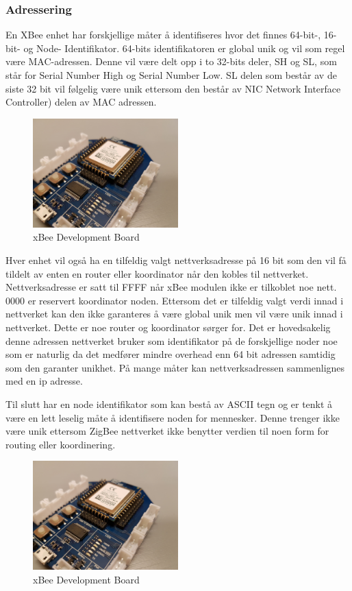 \documentclass{article}
\begin{document}
\subsubsection{Adressering}
En XBee enhet har forskjellige måter å identifiseres  hvor det finnes 64-bit-, 16-bit- og Node- Identifikator. 64-bits identifikatoren er global unik og vil som regel være MAC-adressen. Denne vil være delt opp i to 32-bits deler, SH og SL, som står for Serial Number High og Serial Number Low. SL delen som består av de siste 32 bit vil følgelig være unik ettersom den består av NIC Network Interface Controller) delen av MAC adressen. 


\begin{figure}[h!]
\centering
   \includegraphics[width=0.5\textwidth]{xbeekort}
\caption{xBee Development Board}
\end{figure}

Hver enhet vil også ha en tilfeldig valgt nettverksadresse på 16 bit som den vil få tildelt av enten en router eller koordinator når den kobles til nettverket. Nettverksadresse er satt til FFFF når xBee modulen ikke er tilkoblet noe nett. 0000 er reservert koordinator noden. Ettersom det er tilfeldig valgt verdi innad i nettverket kan den ikke garanteres å være global unik men vil være unik innad i nettverket. Dette er noe router og koordinator sørger for. Det er hovedsakelig denne adressen nettverket bruker som identifikator på de forskjellige noder noe som er naturlig da det medfører mindre overhead enn 64 bit adressen samtidig som den garanter unikhet.  På mange måter kan nettverksadressen sammenlignes med en ip adresse.

Til slutt har en node identifikator som kan bestå av ASCII tegn og er tenkt å være en lett leselig måte å identifisere noden for mennesker. Denne trenger ikke være unik ettersom ZigBee nettverket ikke benytter verdien til noen form for routing eller koordinering. 


\begin{figure}[h!]
\centering
   \includegraphics[width=0.5\textwidth]{xbeekort}
\caption{xBee Development Board}
\end{figure}
\end{document}
